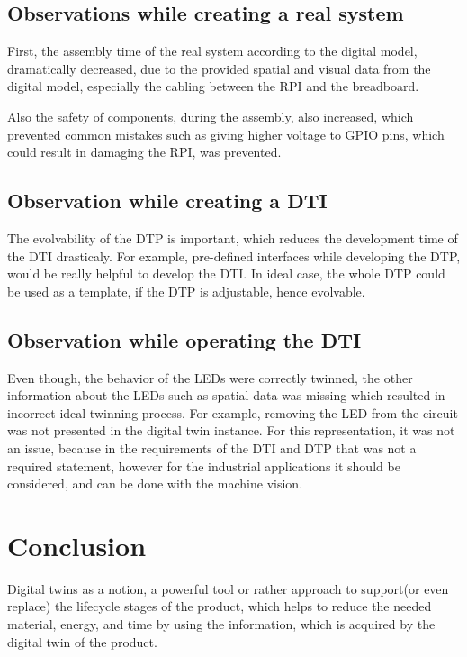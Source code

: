 \documentclass[conference]{IEEEtran}
\begin{document}
    \subsection{Observations while creating a real system}

    First, the assembly time of the real system according to the digital model, dramatically decreased, due to the provided spatial and visual data from the digital model, especially the cabling between the RPI and the breadboard. 

    Also the safety of components, during the assembly, also increased, which prevented common mistakes such as giving higher voltage to GPIO pins, which could result in damaging the RPI, was prevented. 

    \subsection{Observation while creating a DTI}

    The evolvability of the DTP is important, which reduces the development time of the DTI drasticaly. For example, pre-defined interfaces while developing the DTP, would be really helpful to develop the DTI. In ideal case, the whole DTP could be used as a template, if the DTP is adjustable, hence evolvable. 

    \subsection{Observation while operating the DTI}

    Even though, the behavior of the LEDs were correctly twinned, the other information about the LEDs such as spatial data was missing which resulted in incorrect ideal twinning process. For example, removing the LED from the circuit was not presented in the digital twin instance. For this representation, it was not an issue, because in the requirements of the DTI and DTP that was not a required statement, however for the industrial applications it should be considered, and can be done with the machine vision. 

    \section{Conclusion}

    Digital twins as a notion, a powerful tool or rather approach to support(or even replace) the lifecycle stages of the product, which helps to reduce the needed material, energy, and time by using the information, which is acquired by the digital twin of the product. 
\end{document}
